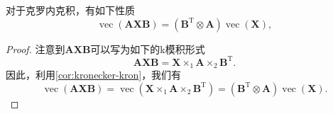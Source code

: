 \begin{corollary}
    对于克罗内克积，有如下性质
    \[
        \operatorname{vec}(\mathbf{A} \mathbf{X} \mathbf{B}) = (\mathbf{B}^{\mathrm{T}} \otimes \mathbf{A}) \operatorname{vec}(\mathbf{X}),
    \]
\end{corollary}
\begin{proof}
    注意到\( \mathbf{A} \mathbf{X} \mathbf{B} \)可以写为如下的k模积形式
    \[
        \mathbf{A} \mathbf{X} \mathbf{B} = \mathbf{X} \times_1 \mathbf{A} \times_2 \mathbf{B}^{\mathrm{T}}.
    \]
    因此，利用\cref{cor:kronecker-kron}，我们有
    \[
        \operatorname{vec}(\mathbf{A} \mathbf{X} \mathbf{B}) = \operatorname{vec}( \mathbf{X} \times_1 \mathbf{A} \times_2 \mathbf{B}^{\mathrm{T}}) = (\mathbf{B}^{\mathrm{T}} \otimes \mathbf{A}) \operatorname{vec}(\mathbf{X}).
    \]
\end{proof}